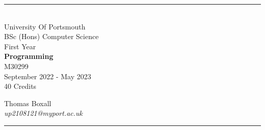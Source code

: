 \documentclass[a4paper, 11pt]{report}
\begin{document}
\begin{titlepage}
    \rule{\textwidth}{1px}
    \vspace{0.025\textheight}\\
    \huge{University Of Portsmouth}\\
    \huge{BSc (Hons) Computer Science}\\
    \huge{First Year}\\
    \vfill
    \LARGE{\textbf{Programming}}\\
    \Large{M30299}\\
    \large{September 2022 - May 2023}\\
    \large{40 Credits}
    \vfill

    
    \begin{FlushRight}
        \large{Thomas Boxall}\\
        \textit{up2108121@myport.ac.uk}\\
        
    \end{FlushRight}
    \vspace{0.2\textheight}
    \rule{\textwidth}{1px}
    
\end{titlepage}

\tableofcontents




\end{document}
